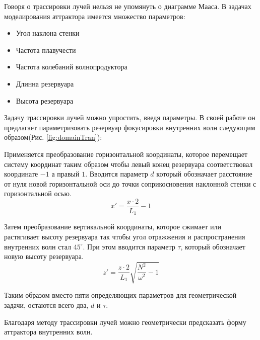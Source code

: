 Говоря о трассировки лучей нельзя не упомянуть о диаграмме Мааса\cite{Maas1997}. В задачах моделирования аттрактора имеется множество параметров:

\begin{itemize}
    \item Угол наклона стенки
    \item Частота плавучести
    \item Частота колебаний волнопродуктора
    \item Длинна резервуара
    \item Высота резервуара
\end{itemize}

Задачу трассировки лучей можно упростить, введя параметры. В своей работе он предлагает параметризовать резервуар фокусировки внутренних волн следующим образом(Рис. \ref{fig:domainTran}):

Применяется преобразование горизонтальной координаты, которое перемещает систему координат таким образом чтобы левый конец резервуара соответствовал координате $-1$ а правый $1$. Вводится параметр $d$ который обозначает расстояние от нуля новой горизонтальной оси до точки соприкосновения наклонной стенки с горизонтальной осью.
\begin{equation}
    x'=\frac{x\cdot 2}{L_1}-1
    \label{eq:transformX}
\end{equation}

Затем преобразование вертикальной координаты, которое сжимает или растягивает высоту резервуара так чтобы угол отражжения и распространения внутренних волн стал $45^\circ$. При этом вводится параметр $\tau$, который обозначает новую высоту резервуара. 
\begin{equation}
    z'=\frac{z\cdot 2}{L_1}\sqrt{\frac{N^2}{\omega^2}-1}
    \label{eq:transformZ}
\end{equation}

Таким образом вместо пяти определяющих параметров для геометрической задачи, остаются всего два, $d$ и $\tau$.

Благодаря методу трассировки лучей можно геометрически предсказать форму аттрактора внутренних волн. 

